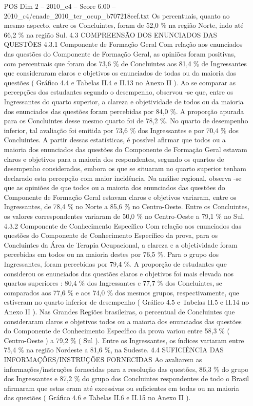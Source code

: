 \begin{textsample}{POS Dim 2 – 2010\_c4 – Score 6.00 – 2010\_c4/enade\_2010\_ter\_ocup\_b707218cef.txt}
Os percentuais, quanto ao mesmo aspecto, entre os Concluintes, foram de 52,0 \% na região Norte, indo até 66,2 \% na região Sul. 4.3 COMPREENSÃO DOS ENUNCIADOS DAS QUESTÕES 4.3.1 Componente de Formação Geral Com relação aos enunciados das questões do Componente de Formação Geral, as opiniões foram positivas, com percentuais que foram dos 73,6 \% de Concluintes aos 81,4 \% de Ingressantes que consideraram claros e objetivos os enunciados de todas ou da maioria das questões ( Gráfico 4.4 e Tabelas II.4 e II.13 no Anexo II ).
Ao se comparar as percepções dos estudantes segundo o desempenho, observou -se que, entre os Ingressantes do quarto superior, a clareza e objetividade de todos ou da maioria dos enunciados das questões foram percebidas por 84,0 \%.
A proporção apurada para os Concluintes desse mesmo quarto foi de 78,2 \%.
No quarto de desempenho inferior, tal avaliação foi emitida por 73,6 \% dos Ingressantes e por 70,4 \% dos Concluintes.
A partir dessas estatísticas, é possível afirmar que todos ou a maioria dos enunciados das questões do Componente de Formação Geral estavam claros e objetivos para a maioria dos respondentes, segundo os quartos de desempenho considerados, embora os que se situaram no quarto superior tenham declarado esta percepção com maior incidência.
Na análise regional, observa -se que as opiniões de que todos ou a maioria dos enunciados das questões do Componente de Formação Geral estavam claros e objetivos variaram, entre os Ingressantes, de 78,4 \% no Norte a 85,6 \% no Centro-Oeste.
Entre os Concluintes, os valores correspondentes variaram de 50,0 \% no Centro-Oeste a 79,1 \% no Sul. 4.3.2 Componente de Conhecimento Específico Com relação aos enunciados das questões do Componente de Conhecimento Específico da prova, para os Concluintes da Área de Terapia Ocupacional, a clareza e a objetividade foram percebidas em todos ou na maioria destes por 76,5 \%.
Para o grupo dos Ingressantes, foram percebidas por 79,4 \%.
A proporção de estudantes que considerou os enunciados das questões claros e objetivos foi mais elevada nos quartos superiores : 80,4 \% dos Ingressantes e 77,7 \% dos Concluintes, se comparados aos 77,6 \% e aos 74,0 \% dos mesmos grupos, respectivamente, que estiveram no quarto inferior de desempenho ( Gráfico 4.5 e Tabelas II.5 e II.14 no Anexo II ).
Nas Grandes Regiões brasileiras, o percentual de Concluintes que consideraram claros e objetivos todos ou a maioria dos enunciados das questões do Componente de Conhecimento Específico da prova variou entre 58,3 \% ( Centro-Oeste ) a 79,2 \% ( Sul ).
Entre os Ingressantes, os índices variaram entre 75,4 \% na região Nordeste a 81,6 \%, na Sudeste. 4.4 SUFICIÊNCIA DAS INFORMAÇÕES/INSTRUÇÕES FORNECIDAS Ao avaliarem as informações/instruções fornecidas para a resolução das questões, 86,3 \% do grupo dos Ingressantes e 87,2 \% do grupo dos Concluintes respondentes de todo o Brasil afirmaram que estas eram até excessivas ou suficientes em todas ou na maioria das questões ( Gráfico 4.6 e Tabelas II.6 e II.15 no Anexo II ).

\end{textsample}
